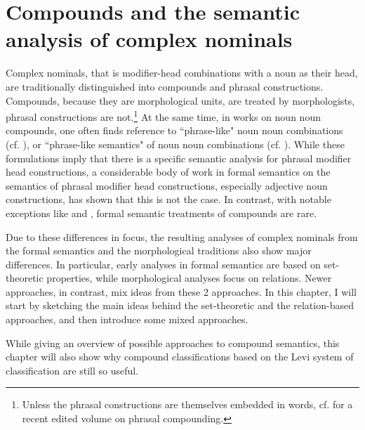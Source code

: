  
\chapter[The semantic analysis of compounds]{Compounds and the semantic analysis of complex nominals}
\label{cha:semantics}

Complex nominals, that is modifier-head combinations with a noun as
their head, are traditionally distinguished into compounds and phrasal
constructions. Compounds, because they are morphological units, are
treated by morphologists, phrasal constructions are not.\footnote{Unless the phrasal constructions are themselves embedded in words, cf. \citet{TripsandKornfilt:2017} for a recent edited volume on phrasal compounding.} At the same
time, in works on noun noun compounds, one often finds reference to
``phrase-like" noun noun combinations
(cf. \citealt[8]{Giegerich:2009}), or ``phrase-like semantics"  of noun
noun combinations (cf. \citealt[48]{Bell:2012}). While these
formulations imply that there is a specific semantic analysis for
phrasal modifier head constructions, a considerable body of work in
formal semantics on the semantics of phrasal modifier head
constructions, especially adjective noun constructions, has
shown that this is not the case. In contrast, with notable exceptions
like \citet{Fanselow:1981} and \citet{Meyer:1993}, formal semantic treatments of compounds
are rare.

Due to these differences in focus, the resulting analyses of complex
nominals from the formal semantics and the morphological  traditions also show major
differences. In particular, early
 analyses in formal semantics are based on set-theoretic properties, while morphological analyses focus on
relations. Newer approaches, in contrast, mix ideas from
these 2 approaches.
In this chapter, I will start by sketching the main ideas behind the
set-theoretic and the relation-based approaches, and then introduce some mixed
approaches. 

While giving an overview of possible approaches to compound
semantics, this chapter will also show why compound classifications
based on the Levi system of classification are still so useful.


